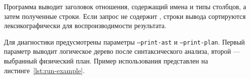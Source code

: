 \documentclass[14pt, russian]{scrartcl}
\begin{document}
Программа выводит заголовок отношения, содержащий имена и типы столбцов, а
затем полученные строки. Если запрос не содержит \ORDERBY{}, строки вывода
сортируются лексикографически для воспроизводимости результата.

Для диагностики предусмотрены параметры \texttt{--print-ast} и
\texttt{--print-plan}. Первый параметр выводит логическое дерево после
синтаксического анализа, второй --- выбранный физический план.
Пример использования представлен на листинге~\ref{lst:run-example}.






\end{document}
